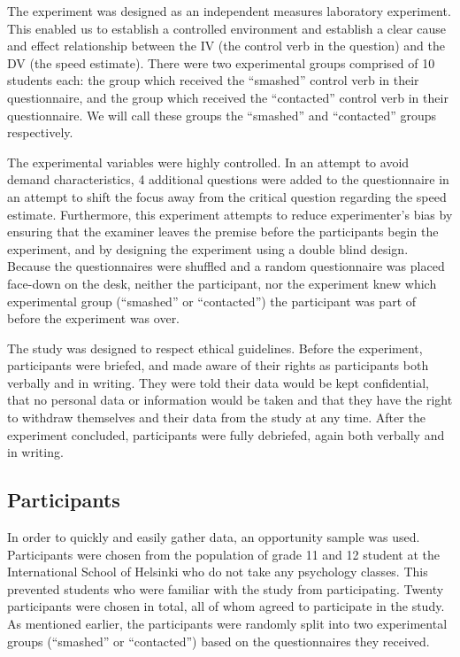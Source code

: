 \documentclass[a4paper,11pt]{report}
\begin{document}
The experiment was designed as an independent measures laboratory experiment.
This enabled us to establish a controlled environment and establish a clear
cause and effect relationship between the IV (the control verb in the question)
and the DV (the speed estimate). There were two experimental groups comprised
of 10 students each: the group which received the “smashed” control verb in
their questionnaire, and the group which received the “contacted” control verb
in their questionnaire. We will call these groups the “smashed” and “contacted”
groups respectively.

The experimental variables were highly controlled. In an attempt to avoid
demand characteristics, 4 additional questions were added to the questionnaire
in an attempt to shift the focus away from the critical question regarding the
speed estimate. Furthermore, this experiment attempts to reduce experimenter’s
bias by ensuring that the examiner leaves the premise before the participants
begin the experiment, and by designing the experiment using a double blind
design. Because the questionnaires were shuffled and a random questionnaire was
placed face-down on the desk, neither the participant, nor the experiment knew
which experimental group (“smashed” or “contacted”) the participant was part of
before the experiment was over.

The study was designed to respect ethical guidelines. Before the experiment,
participants were briefed, and made aware of their rights as participants both
verbally and in writing. They were told their data would be kept confidential,
that no personal data or information would be taken and that they have the
right to withdraw themselves and their data from the study at any time. After
the experiment concluded, participants were fully debriefed, again both
verbally and in writing.

\subsection{Participants}

In order to quickly and easily gather data, an opportunity sample was used.
Participants were chosen from the population of grade 11 and 12 student at the
International School of Helsinki who do not take any psychology classes. This
prevented students who were familiar with the study from participating. Twenty
participants were chosen in total, all of whom agreed to participate in the
study. As mentioned earlier, the participants were randomly split into two
experimental groups (“smashed” or “contacted”) based on the questionnaires they
received.
\end{document}
